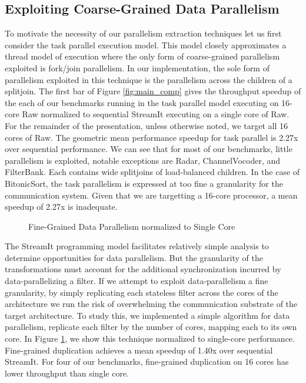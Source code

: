 \subsection{Exploiting Coarse-Grained Data Parallelism}
To motivate the necessity of our parallelism extraction techniques let
us first consider the task parallel execution model.  This model
closely approximates a thread model of execution where the only form
of coarse-grained parallelism exploited is fork/join parallelism.  In
our implementation, the sole form of parallelism exploited in this
technique is the parallelism across the children of a splitjoin. The
first bar of Figure \ref{fig:main_comp} gives the throughput speedup
of the each of our benchmarks running in the task parallel model
executing on 16-core Raw normalized to sequential StreamIt executing
on a single core of Raw.  For the remainder of the presentation,
unless otherwise noted, we target all 16 cores of Raw.  The geometric
mean performance speedup for task parallel is 2.27x over sequential
performance. We can see that for most of our benchmarks, little
parallelism is exploited, notable exceptions are Radar,
ChannelVocoder, and FilterBank.  Each contains wide splitjoins of
load-balanced children.  In the case of BitonicSort, the task
parallelism is expressed at too fine a granularity for the
communication system.  Given that we are targetting a 16-core
processor, a mean speedup of 2.27x is inadequate.

\begin{figure}[t]
\centering
{}
\caption{Fine-Grained Data Parallelism normalized to Single Core
\protect\label{fig:fine_data}}
\end{figure}
The StreamIt programming model facilitates relatively simple analysis
to determine opportunities for data parallelism.  But the granularity
of the transformations must account for the additional synchronization
incurred by data-parallelizing a filter.  If we attempt to exploit
data-parallelism a fine granularity, by simply replicating each
stateless filter across the cores of the architecture we run the risk
of overwhelming the communication substrate of the target
architecture.  To study this, we implemented a simple algorithm for
data parallelism, replicate each filter by the number of cores,
mapping each to its own core.  In Figure \ref{fig:fine_data}, we show
this technique normalized to single-core performance. Fine-grained
duplication achieves a mean speedup of 1.40x over sequential
StreamIt. For four of our benchmarks, fine-grained duplication on 16
cores has lower throughput than single core.

